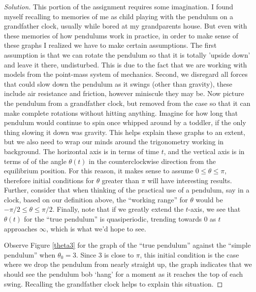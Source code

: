 \documentclass[letterpaper, 12pt]{amsart}
\theoremstyle{definition}  							%
\begin{document}
		\begin{proof}[Solution]
		This portion of the assignment requires some imagination.
		I found myself recalling to memories of me as child playing with the pendulum on a grandfather clock, usually while bored at my grandparents house.
		But even with these memories of how pendulums work in practice, in order to make sense of these graphs I realized we have to make certain assumptions.
		The first assumption is that we can rotate the pendulum so that it is totally 'upside down' and leave it there, undisturbed. 
		This is due to the fact that we are working with models from the point-mass system of mechanics.
		Second, we disregard all forces that could slow down the pendulum as it swings (other than gravity), these include air resistance and friction, however miniscule they may be.
		Now picture the pendulum from a grandfather clock, but removed from the case so that it can make complete rotations without hitting anything.
		Imagine for how long that pendulum would continue to spin once whipped around by a toddler, if the only thing slowing it down was gravity.
		This helps explain these graphs to an extent, but we also need to wrap our minds around the trigonometry working in background.
		The horizontal axis is in terms of time $t$, and the vertical axis is in terms of of the angle $\theta(t)$ in the counterclockwise direction from the equilibrium position.
		For this reason, it makes sense to assume $0 \leq \theta \leq \pi$, therefore initial conditions for $\theta$ greater than $\pi$ will have interesting results.
		Further, consider that when thinking of the practical use of a pendulum, say in a clock, based on our definition above, the ``working range'' for $\theta$ would be $-\pi/2 \leq \theta \leq \pi/2$.
		Finally, note that if we greatly extend the $t$-axis, we see that $\theta(t)$ for the ``true pendulum'' is quasiperiodic, trending towards $0$ as $t$ approaches $\infty$, which is what we'd hope to see.
		\vspace{4mm}

		Observe Figure \ref{theta3} for the graph of the ``true pendulum'' against the ``simple pendulum'' when $\theta_{0} = 3$.
		Since $3$ is close to $\pi$, this initial condition is the case where we drop the pendulum from nearly straight up, the graph indicates that we should see the pendulum bob `hang' for a moment as it reaches the top of each swing.
		Recalling the grandfather clock helps to explain this situation.


\end{proof}
\end{document}
